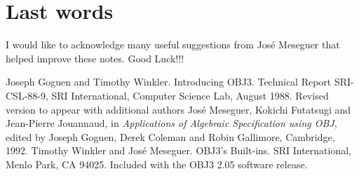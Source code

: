\section{Last words}

I would like to acknowledge many useful suggestions from Jos\'{e}
Meseguer that helped improve these notes.  Good Luck!!!

%
\begin{thebibliography}{1}
  
 Joseph Goguen and Timothy Winkler.  \newblock
  Introducing {OBJ3}.  \newblock Technical Report SRI-CSL-88-9, SRI
  International, Computer Science Lab, August 1988.  \newblock Revised
  version to appear with additional authors Jos\'e Meseguer, Kokichi
  Futatsugi and Jean-Pierre Jouannaud, in {\em Applications of
    Algebraic Specification using {OBJ}}, edited by Joseph Goguen,
  Derek Coleman and Robin Gallimore, Cambridge, 1992.
 Timothy Winkler and Jos\'e Meseguer. \newblock
  {OBJ3}'s Built-ins. \newblock SRI International, Menlo Park, CA
  94025.  \newblock Included with the OBJ3 2.05 software release.

\end{thebibliography}

\newpage
\tableofcontents


